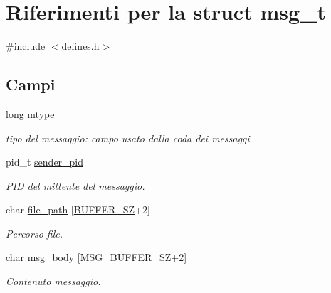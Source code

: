\hypertarget{structmsg__t}{}\section{Riferimenti per la struct msg\+\_\+t}
\label{structmsg__t}


{\ttfamily \#include $<$defines.\+h$>$}

\subsection*{Campi}
\begin{DoxyCompactItemize}
\item 
\mbox{\label{structmsg__t_ad68bba21a7563b7da0f83beee6d822ec}} 
long \hyperlink{structmsg__t_ad68bba21a7563b7da0f83beee6d822ec}{mtype}
\begin{DoxyCompactList}\small\item\em tipo del messaggio\+: campo usato dalla coda dei messaggi \end{DoxyCompactList}\item 
\mbox{\label{structmsg__t_ae79f37d3dc8230fd465f68f694bbc059}} 
pid\+\_\+t \hyperlink{structmsg__t_ae79f37d3dc8230fd465f68f694bbc059}{sender\+\_\+pid}
\begin{DoxyCompactList}\small\item\em P\+ID del mittente del messaggio. \end{DoxyCompactList}\item 
\mbox{\label{structmsg__t_af731767e75e31a9e93fbdc91b4119d6f}} 
char \hyperlink{structmsg__t_af731767e75e31a9e93fbdc91b4119d6f}{file\+\_\+path} \mbox{[}\hyperlink{defines_8h_a22ad48d95fdd6689ea92e17ca5bbfccb}{B\+U\+F\+F\+E\+R\+\_\+\+SZ}+2\mbox{]}
\begin{DoxyCompactList}\small\item\em Percorso file. \end{DoxyCompactList}\item 
\mbox{\label{structmsg__t_ad212a8746fcd05ce2f48e9d2c854071b}} 
char \hyperlink{structmsg__t_ad212a8746fcd05ce2f48e9d2c854071b}{msg\+\_\+body} \mbox{[}\hyperlink{defines_8h_a46b84a677ff2bcf693b89247e39d75f7}{M\+S\+G\+\_\+\+B\+U\+F\+F\+E\+R\+\_\+\+SZ}+2\mbox{]}
\begin{DoxyCompactList}\small\item\em Contenuto messaggio. \end{DoxyCompactList}\end{DoxyCompactItemize}


